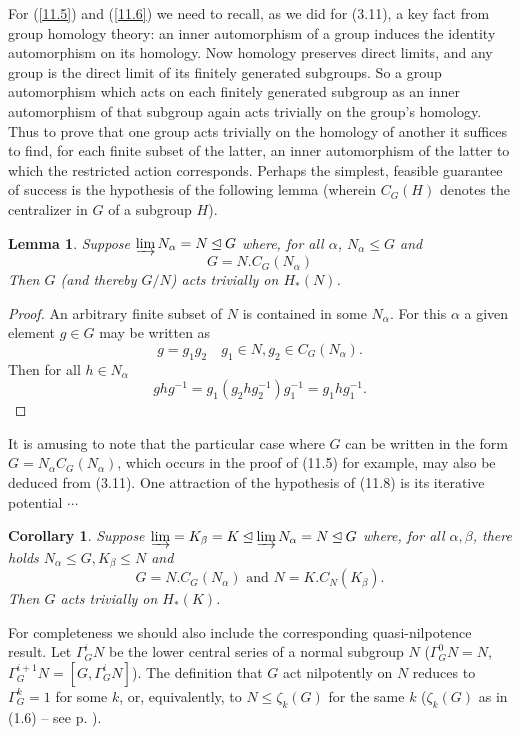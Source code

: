 \documentclass[openany,leqno]{book}  %
\newtheorem{lemma}[theorem]{Lemma}
\newtheorem{corollary}[theorem]{Corollary}
\begin{document}
For (\ref{11.5}) and (\ref{11.6}) we need to recall, as we did for (3.11), a key fact from group homology theory: an inner automorphism of a group induces the identity automorphism on its homology. Now homology preserves direct limits, and any group is the direct limit of its finitely generated subgroups. So a group automorphism which acts on each finitely generated subgroup as an inner automorphism of that subgroup again acts trivially on the group's homology. Thus to prove that one group acts trivially on the homology of another it suffices to find, for each finite subset of the latter, an inner automorphism of the latter to which the restricted action corresponds. Perhaps the simplest, feasible guarantee of success is the hypothesis of the following lemma (wherein $C_G(H)$ denotes the centralizer in $G$ of a subgroup $H$).
\begin{lemma}
  Suppose $\varinjlim N_\alpha = N \unlhd G$ where, for all $\alpha$, $N_\alpha \leqslant G$ and
  \[G=N.C_G(N_\alpha)\]
Then $G$ (and thereby $G/N$) acts trivially on $H_*(N)$.
\end{lemma}
\begin{proof}
  An arbitrary finite subset of $N$ is contained in some $N_\alpha$. For this $\alpha$ a given element $g \in G$ may be written as
\[g = g_1g_2 \quad g_1\in N, g_2\in C_G(N_\alpha).\]
Then for all $ h \in N_\alpha$
\[ghg^{-1} = g_1(g_2hg_2^{-1})g_1^{-1} = g_1hg_1^{-1}.\]
\end{proof}
It is amusing to note that the particular case where $G$ can be written in the form $G = N_\alpha C_G(N_\alpha )$, which occurs in the proof of (11.5) for example, may also be deduced from (3.11). One attraction of the hypothesis of (11.8) is its iterative potential $\cdots $
\begin{corollary}
  Suppose $\varinjlim = K_\beta =K \unlhd \varinjlim N_\alpha= N \unlhd G$ where, for all $\alpha,\beta$, there holds $N_\alpha \leqslant G, K_\beta \leqslant N$ and
  \[G = N. C_G(N_\alpha ) \mbox{ and } N = K.C_N(K_\beta).\]
Then $G$ acts trivially on $H_*(K)$.
\end{corollary}
For completeness we should also include the corresponding quasi-nilpotence result. Let $\Gamma_G^i N$ be the lower central series of a normal subgroup $N$ ($\Gamma_G^0 N = N$, $\Gamma_G^{i+1}N = [G, \Gamma_G^iN]$). The definition that $G$ act nilpotently on $N$ reduces to $\Gamma_G^k= 1$ for some $k$, or, equivalently, to $N \leqslant \zeta_k(G)$ for the same $k$ ($\zeta_k(G)$ as in (1.6) -- see p. \pageref{page37}).
\end{document}
